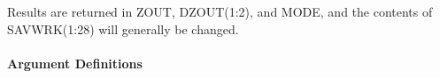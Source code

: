 \documentclass[twoside]{MATH77}
\begin{document}
\begin{center}
\end{center}

Results are returned in ZOUT, DZOUT(1:2), and MODE, and the contents of
SAVWRK(1:28) will generally be changed.

\paragraph{Argument Definitions}
\end{document}

